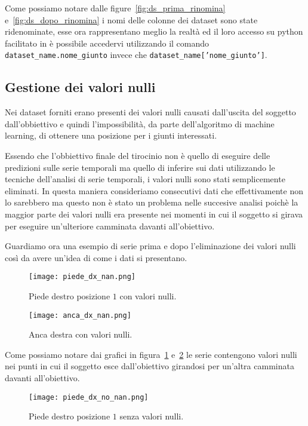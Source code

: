 Come possiamo notare dalle figure~\ref*{fig:ds_prima_rinomina} e~\ref*{fig:ds_dopo_rinomina}
i nomi delle colonne dei dataset sono state ridenominate, esse ora rappresentano meglio
la realtà ed il loro accesso su python facilitato in è possibile accedervi utilizzando
il comando \texttt{dataset\_name.nome\_giunto} invece che \texttt{dataset\_name['nome\_giunto']}.



\subsection{Gestione dei valori nulli}
Nei dataset forniti erano presenti dei valori nulli causati
dall'uscita del soggetto dall'obbiettivo e quindi l'impossibilità, da parte dell'algoritmo
di machine learning, di ottenere una posizione per i giunti interessati.

Essendo che l'obbiettivo finale del tirocinio non è quello di eseguire delle predizioni
sulle serie temporali ma quello di inferire sui dati utilizzando le tecniche
dell'analisi di serie temporali, i valori nulli sono stati semplicemente eliminati.
In questa maniera consideriamo consecutivi dati che effettivamente non lo sarebbero
ma questo non è stato un problema nelle succesive analisi poichè la maggior parte dei 
valori nulli era presente nei momenti in cui il soggetto si girava per eseguire un'ulteriore
camminata davanti all'obiettivo.

Guardiamo ora una esempio di serie prima e dopo l'eliminazione dei valori nulli così da avere
un'idea di come i dati si presentano.

\begin{figure}[H]
    \centering
    \texttt{[image: piede\_dx\_nan.png]}
    \caption{Piede destro posizione $1$ con valori nulli.}
    \label{fig:piede_dx_1_nan}
\end{figure}

\begin{figure}[H]
    \centering
    \texttt{[image: anca\_dx\_nan.png]}
    \caption{Anca destra con valori nulli.}
    \label{fig:anca_dx_nan}
\end{figure}

Come possiamo notare dai grafici in figura~\ref*{fig:piede_dx_1_nan} e~\ref*{fig:anca_dx_nan}
le serie contengono valori nulli nei punti in cui il soggetto esce dall'obiettivo girandosi
per un'altra camminata davanti all'obiettivo.

\begin{figure}[H]
    \centering
    \texttt{[image: piede\_dx\_no\_nan.png]}
    \caption{Piede destro posizione $1$ senza valori nulli.}
    \label{fig:piede_dx_1_no_nan}
\end{figure}


